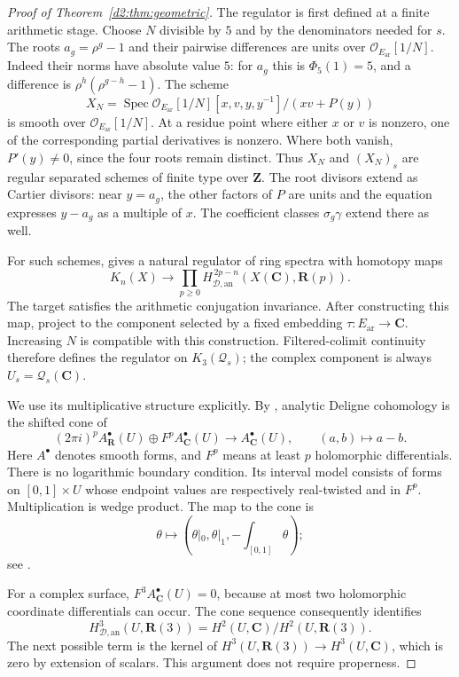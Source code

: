 \documentclass[11pt,a4paper]{amsart}
\numberwithin{equation}{section}
\theoremstyle{definition}
\theoremstyle{remark}
\newcommand{\DtwoZZ}{\mathbf{Z}}
\newcommand{\DtwoRR}{\mathbf{R}}
\newcommand{\DtwoCC}{\mathbf{C}}
\newcommand{\DtwocO}{\mathcal O}
\newcommand{\DtwocQ}{\mathcal Q}
\newcommand{\Dtwoar}{\mathrm{ar}}
\newcommand{\Dtwoan}{\mathrm{an}}
\newcommand{\DtwoSpec}{\operatorname{Spec}}
\begin{document}
\begin{proof}[Proof of Theorem~\ref{d2:thm:geometric}]
The regulator is first defined at a finite arithmetic stage.
Choose \(N\) divisible by \(5\) and by the denominators needed for
\(s\). The roots \(a_g=\rho^g-1\) and their pairwise differences are
units over \(\DtwocO_{E_{\Dtwoar}}[1/N]\).
Indeed their norms have absolute value \(5\):
for \(a_g\) this is \(\Phi_5(1)=5\), and a difference is
\(\rho^h(\rho^{g-h}-1)\).
The scheme
\[
 X_N=\DtwoSpec
 \DtwocO_{E_{\Dtwoar}}[1/N][x,v,y,y^{-1}]/(xv+P(y))
\]
is smooth over \(\DtwocO_{E_{\Dtwoar}}[1/N]\).
At a residue point where either \(x\) or \(v\) is nonzero, one of the
corresponding partial derivatives is nonzero.
Where both vanish, \(P'(y)\ne0\), since the four roots remain distinct.
Thus \(X_N\) and \((X_N)_s\) are regular separated schemes of finite
type over \(\DtwoZZ\).
The root divisors extend as Cartier divisors: near \(y=a_g\), the
other factors of \(P\) are units and the equation expresses
\(y-a_g\) as a multiple of \(x\).
The coefficient classes \(\sigma_g\gamma\) extend there as well.

For such schemes, \cite[Theorem~2.31 and Remark~2.27]{BunkeTamme}
gives a natural regulator of ring spectra with homotopy maps
\[
 K_n(X)\longrightarrow
 \prod_{p\ge0}H_{\mathcal D,\Dtwoan}^{\,2p-n}
                  (X(\DtwoCC),\DtwoRR(p)).
\]
The target satisfies the arithmetic conjugation invariance.
After constructing this map, project to the component selected by
a fixed embedding \(\tau\colon E_{\Dtwoar}\to\DtwoCC\).
Increasing \(N\) is compatible with this construction.
Filtered-colimit continuity
\cite[IV, Section~6.4]{Weibel} therefore defines the regulator on
\(K_3(\DtwocQ_s)\); the complex component is always
\(U_s=\DtwocQ_s(\DtwoCC)\).

We use its multiplicative structure explicitly.
By \cite[Remark~2.6 and Definition~2.7]{BunkeTamme}, analytic
Deligne cohomology is the shifted cone of
\[
 (2\pi i)^pA_\DtwoRR^\bullet(U)
       \oplus F^pA_\DtwoCC^\bullet(U)
 \longrightarrow A_\DtwoCC^\bullet(U),
 \qquad (a,b)\longmapsto a-b.
\]
Here \(A^\bullet\) denotes smooth forms, and \(F^p\) means at least
\(p\) holomorphic differentials. There is no logarithmic boundary
condition. Its interval model consists of forms on
\([0,1]\times U\) whose endpoint values are respectively real-twisted
and in \(F^p\).
Multiplication is wedge product.
The map to the cone is
\[
 \theta\longmapsto
 \left(\theta|_0,\theta|_1,-\int_{[0,1]}\theta\right);
\]
see \cite[Proposition~2.8 and Corollary~2.14]{BunkeTamme}.

For a complex surface, \(F^3A_\DtwoCC^\bullet(U)=0\), because at most two
holomorphic coordinate differentials can occur.
The cone sequence consequently identifies
\begin{equation}\label{d2:eq:analytic-quotient}
 H_{\mathcal D,\Dtwoan}^{3}(U,\DtwoRR(3))
   =H^2(U,\DtwoCC)/H^2(U,\DtwoRR(3)).
\end{equation}
The next possible term is the kernel of
\(H^3(U,\DtwoRR(3))\to H^3(U,\DtwoCC)\), which is zero by extension of
scalars. This argument does not require properness.


\end{proof}
\end{document}
